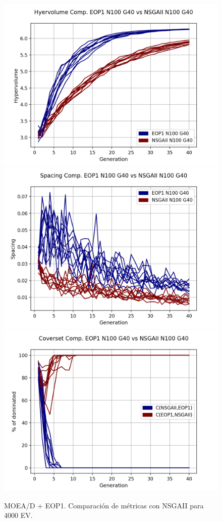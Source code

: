 \begin{figure}[H]
\centering
\includegraphics[scale=0.35]{../METRICS_PLOTS/Hypervol_COMP_EOP1N100G40_NSGAIIN100G40.png}
\includegraphics[scale=0.35]{../METRICS_PLOTS/Spacing_COMP_EOP1N100G40_NSGAIIN100G40.png}
\includegraphics[scale=0.35]{../METRICS_PLOTS/CoverSet_COMP_EOP1N100G40_NSGAIIN100G40.png}\\
\caption{MOEA/D + EOP1. Comparación de métricas con NSGAII para 4000 EV.}
\label{fig:9}
\end{figure}



